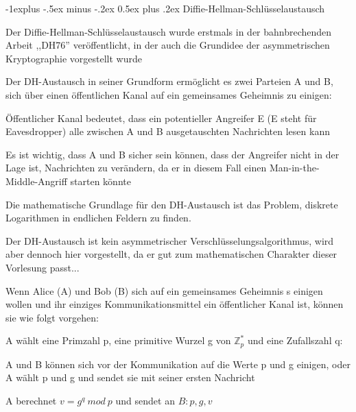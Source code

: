 \documentclass[a4paper]{article}
\makeatletter
\renewcommand{\subsection}{\@startsection{subsection}{2}{0mm}%
 {-1explus -.5ex minus -.2ex}%
 {0.5ex plus .2ex}%
 {\normalfont\normalsize\bfseries}}
\makeatother
\begin{document}
\begin{multicols}{3}
      \subsection{Diffie-Hellman-Schlüsselaustausch}
      \begin{itemize*}
            \item Der Diffie-Hellman-Schlüsselaustausch wurde erstmals in der bahnbrechenden Arbeit ,,DH76'' veröffentlicht, in der auch die Grundidee der asymmetrischen Kryptographie vorgestellt wurde
            \item Der DH-Austausch in seiner Grundform ermöglicht es zwei Parteien A und B, sich über einen öffentlichen Kanal auf ein gemeinsames Geheimnis zu einigen:
            \begin{itemize*}
                  \item Öffentlicher Kanal bedeutet, dass ein potentieller Angreifer E (E steht für Eavesdropper) alle zwischen A und B ausgetauschten Nachrichten lesen kann
                  \item Es ist wichtig, dass A und B sicher sein können, dass der Angreifer nicht in der Lage ist, Nachrichten zu verändern, da er in diesem Fall einen Man-in-the-Middle-Angriff starten könnte
                  \item Die mathematische Grundlage für den DH-Austausch ist das Problem, diskrete Logarithmen in endlichen Feldern zu finden.
                  \item Der DH-Austausch ist kein asymmetrischer Verschlüsselungsalgorithmus, wird aber dennoch hier vorgestellt, da er gut zum mathematischen Charakter dieser Vorlesung passt...
            \end{itemize*}
            \item Wenn Alice (A) und Bob (B) sich auf ein gemeinsames Geheimnis s einigen wollen und ihr einziges Kommunikationsmittel ein öffentlicher Kanal ist, können sie wie folgt vorgehen:
            \begin{itemize*}
                  \item A wählt eine Primzahl p, eine primitive Wurzel g von $\mathbb{Z}^*_p$ und eine Zufallszahl q:
                  \begin{itemize*}
                        \item A und B können sich vor der Kommunikation auf die Werte p und g einigen, oder A wählt p und g und sendet sie mit seiner ersten Nachricht
                        \item A berechnet $v=g^q\ mod\ p$ und sendet an $B:{p,g,v}$

\end{itemize*}
\end{itemize*}
\end{itemize*}
\end{multicols}
\end{document}
